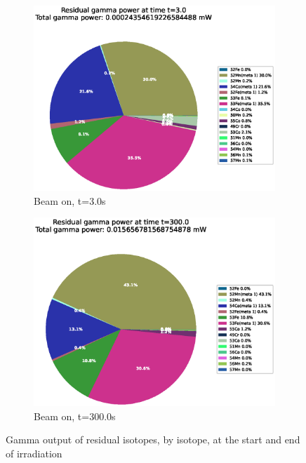 \begin{figure}[htb]
\centering
\begin{subfigure}{0.49\textwidth}
  \includegraphics[width=\linewidth]{chapters/activity_code/fe-activity-v2/residual-energy/0001_3.eps}
  \caption{Beam on, t=3.0s}
  \label{fig:activity-v2-residual-1}
\end{subfigure}\hfil %
\begin{subfigure}{0.49\textwidth}
  \includegraphics[width=\linewidth]{chapters/activity_code/fe-activity-v2/residual-energy/0100_300.eps}
  \caption{Beam on, t=300.0s}
  \label{fig:activity-v2-residual-2}
\end{subfigure}
\caption{Gamma output of residual isotopes, by isotope, at the start and end of irradiation}
\label{fig:activity-v2-residual-a}
\end{figure}

